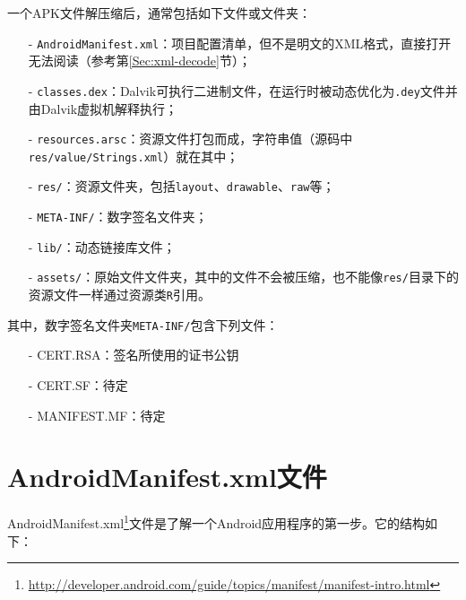 一个APK文件解压缩后，通常包括如下文件或文件夹：
\begin{itemize}
  \item[-] \lstinline!AndroidManifest.xml!：项目配置清单，但不是明文的XML格式，直接打开无法阅读（参考第\ref{Sec:xml-decode}节）；
  \item[-] \lstinline!classes.dex!：Dalvik可执行二进制文件，在运行时被动态优化为\lstinline!.dey!文件并由Dalvik虚拟机解释执行；
  \item[-] \lstinline!resources.arsc!：资源文件打包而成，字符串值（源码中\lstinline!res/value/Strings.xml!）就在其中；
  \item[-] \lstinline!res/!：资源文件夹，包括\lstinline!layout!、\lstinline!drawable!、\lstinline!raw!等；
  \item[-] \lstinline!META-INF/!：数字签名文件夹；
  \item[-] \lstinline!lib/!：动态链接库文件；
  \item[-] \lstinline!assets/!：原始文件文件夹，其中的文件不会被压缩，也不能像\lstinline!res/!目录下的资源文件一样通过资源类\lstinline!R!引用。
\end{itemize}
其中，数字签名文件夹\lstinline!META-INF/!包含下列文件：
\begin{itemize}
  \item[-] CERT.RSA：签名所使用的证书公钥
  \item[-] CERT.SF：待定
  \item[-] MANIFEST.MF：待定
\end{itemize}

\section{AndroidManifest.xml文件}
AndroidManifest.xml\footnote{\url{http://developer.android.com/guide/topics/manifest/manifest-intro.html}}文件是了解一个Android应用程序的第一步。它的结构如下：

